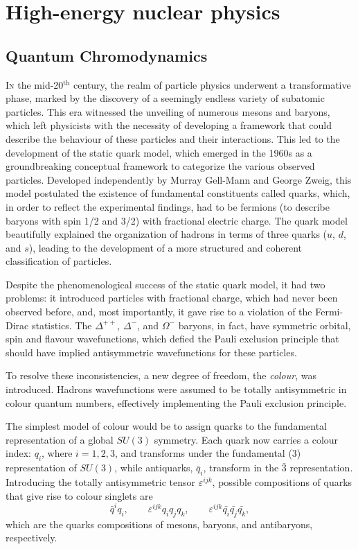 \chapter{High-energy nuclear physics}
\section{Quantum Chromodynamics}
\lettrine[lines=6,findent=0.pt]{I}{n} the mid-20$^{\mathrm{th}}$ century, the realm of particle physics underwent a transformative phase, marked by the discovery of a seemingly endless variety of subatomic particles. This era witnessed the unveiling of numerous mesons and baryons, which left physicists with the necessity of developing a framework that could describe the behaviour of these particles and their interactions. This led to the development of the static quark model, which emerged in the 1960s as a groundbreaking conceptual framework to categorize the various observed particles. Developed independently by Murray Gell-Mann\cite{Gell-Mann:1964ewy} and George Zweig\cite{Zweig:1964jf, Fritzsch:1972jv}, this model postulated the existence of fundamental constituents called quarks, which, in order to reflect the experimental findings, had to be fermions (to describe baryons with spin 1/2 and 3/2) with fractional electric charge. The quark model beautifully explained the organization of hadrons in terms of three quarks ($u$, $d$, and $s$), leading to the development of a more structured and coherent classification of particles.

Despite the phenomenological success of the static quark model, it had two problems: it introduced particles with fractional charge, which had never been observed before, and, most importantly, it gave rise to a violation of the Fermi-Dirac statistics. The $\Delta^{++}$, $\Delta^{-}$, and $\Omega^{-}$ baryons, in fact, have symmetric orbital, spin and flavour wavefunctions, which defied the Pauli exclusion principle that should have implied antisymmetric wavefunctions for these particles.

To resolve these inconsistencies, a new degree of freedom, the \emph{colour}, was introduced. Hadrons wavefunctions were assumed to be totally antisymmetric in colour quantum numbers, effectively implementing the Pauli exclusion principle.

The simplest model of colour would be to assign quarks to the fundamental representation of a global $SU(3)$ symmetry. Each quark now carries a colour index: $q_i$, where $i = 1, 2, 3$, and transforms under the fundamental ($3$) representation of $SU(3)$, while antiquarks,  $\bar{q}_i$, transform in the $\bar{3}$ representation. Introducing the totally antisymmetric tensor $\varepsilon^{ijk}$, possible compositions of quarks that give rise to colour singlets are 
\begin{equation*}
    \bar{q}^iq_i,\qquad \varepsilon^{ijk}q_iq_jq_k,\qquad \varepsilon^{ijk}\bar{q_i}\bar{q_j}\bar{q_k},
\end{equation*}
which are the quarks compositions of mesons, baryons, and antibaryons, respectively. 

